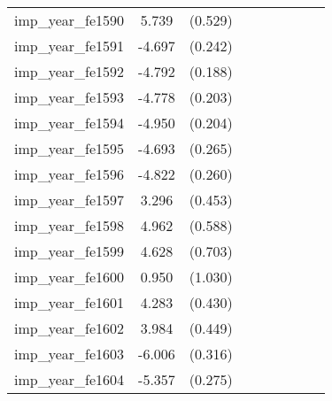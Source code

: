 {\begin{tabular}{l*{4}{cc}}
imp\_year\_fe1590&    5.739\sym{***}&  (0.529)&                  &         &                  &         &                  &         \\
imp\_year\_fe1591&   -4.697\sym{***}&  (0.242)&                  &         &                  &         &                  &         \\
imp\_year\_fe1592&   -4.792\sym{***}&  (0.188)&                  &         &                  &         &                  &         \\
imp\_year\_fe1593&   -4.778\sym{***}&  (0.203)&                  &         &                  &         &                  &         \\
imp\_year\_fe1594&   -4.950\sym{***}&  (0.204)&                  &         &                  &         &                  &         \\
imp\_year\_fe1595&   -4.693\sym{***}&  (0.265)&                  &         &                  &         &                  &         \\
imp\_year\_fe1596&   -4.822\sym{***}&  (0.260)&                  &         &                  &         &                  &         \\
imp\_year\_fe1597&    3.296\sym{***}&  (0.453)&                  &         &                  &         &                  &         \\
imp\_year\_fe1598&    4.962\sym{***}&  (0.588)&                  &         &                  &         &                  &         \\
imp\_year\_fe1599&    4.628\sym{***}&  (0.703)&                  &         &                  &         &                  &         \\
imp\_year\_fe1600&    0.950         &  (1.030)&                  &         &                  &         &                  &         \\
imp\_year\_fe1601&    4.283\sym{***}&  (0.430)&                  &         &                  &         &                  &         \\
imp\_year\_fe1602&    3.984\sym{***}&  (0.449)&                  &         &                  &         &                  &         \\
imp\_year\_fe1603&   -6.006\sym{***}&  (0.316)&                  &         &                  &         &                  &         \\
imp\_year\_fe1604&   -5.357\sym{***}&  (0.275)&                  &         &                  &         &                  &         \\

\end{tabular}}
